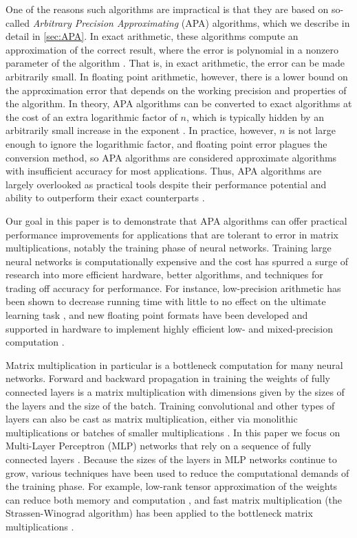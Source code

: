 \documentclass[conference]{IEEEtran}
\begin{document}
One of the reasons such algorithms are impractical is that they are based on so-called \emph{Arbitrary Precision Approximating} (APA) algorithms, which we describe in detail in \cref{sec:APA}.
In exact arithmetic, these algorithms compute an approximation of the correct result, where the error is polynomial in a nonzero parameter of the algorithm \cite{BLR80}.
That is, in exact arithmetic, the error can be made arbitrarily small.
In floating point arithmetic, however, there is a lower bound on the approximation error that depends on the working precision and properties of the algorithm.
In theory, APA algorithms can be converted to exact algorithms at the cost of an extra logarithmic factor of $n$, which is typically hidden by an arbitrarily small increase in the exponent \cite{Bini80}.
In practice, however, $n$ is not large enough to ignore the logarithmic factor, and floating point error plagues the conversion method, so APA algorithms are considered approximate algorithms with insufficient accuracy for most applications.
Thus, APA algorithms are largely overlooked as practical tools despite their performance potential and ability to outperform their exact counterparts \cite{BB15}.

Our goal in this paper is to demonstrate that APA algorithms can offer practical performance improvements for applications that are tolerant to error in matrix multiplications, notably the training phase of neural networks.
Training large neural networks is computationally expensive and the cost has spurred a surge of research into more efficient hardware, better algorithms, and techniques for trading off accuracy for performance.
For instance, low-precision arithmetic has been shown to decrease running time with little to no effect on the ultimate learning task \cite{GAGN15,HCSEB17}, and new floating point formats have been developed and supported in hardware to implement highly efficient low- and mixed-precision computation \cite{KM+19,YWC20}.

Matrix multiplication in particular is a bottleneck computation for many neural networks.
Forward and backward propagation in training the weights of fully connected layers is a matrix multiplication with dimensions given by the sizes of the layers and the size of the batch.
Training convolutional and other types of layers can also be cast as matrix multiplication, either via monolithic multiplications or batches of smaller multiplications \cite{CW+14,GB+19}.
In this paper we focus on Multi-Layer Perceptron (MLP) networks that rely on a sequence of fully connected layers \cite{HSW89}.
Because the sizes of the layers in MLP networks continue to grow, various techniques have been used to reduce the computational demands of the training phase.
For example, low-rank tensor approximation of the weights can reduce both memory and computation \cite{NPOV15}, and fast matrix multiplication (the Strassen-Winograd algorithm) has been applied to the bottleneck matrix multiplications \cite{KAA20}.
\end{document}
